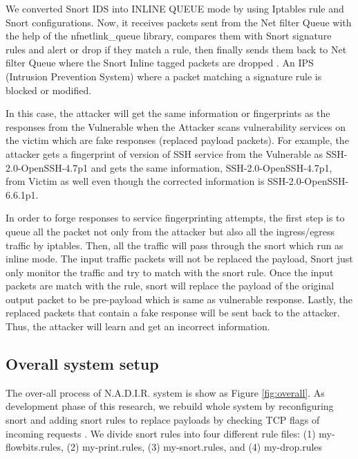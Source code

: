 We converted Snort IDS into INLINE QUEUE mode by using Iptables rule and Snort configurations. Now, it receives packets sent from the Net filter Queue with the help of the nfnetlink\_queue library, compares them with Snort signature rules and alert or drop if they match a rule, then finally sends them back to Net filter Queue where the Snort Inline tagged packets are dropped \cite{misc:netfilter}. An IPS (Intrusion Prevention System) where a packet matching a signature rule is blocked or modified.

In this case, the attacker will get the same information or fingerprints as the responses from the Vulnerable when the Attacker scans vulnerability services on the victim which are fake responses (replaced payload packets). For example, the attacker gets a fingerprint of version of SSH service from the Vulnerable as SSH-2.0-OpenSSH-4.7p1 and gets the same information, SSH-2.0-OpenSSH-4.7p1, from Victim as well even though the corrected information is SSH-2.0-OpenSSH-6.6.1p1.



In order to forge responses to service fingerprinting attempts, the first step is to queue all the packet not only from the attacker but also all the ingress/egress traffic by iptables. Then, all the traffic will pass through the snort which run as inline mode. The input traffic packets will not be replaced the payload, Snort just only monitor the traffic and try to match with the snort rule. Once the input packets are match with the rule, snort will replace the payload of the original output packet to be pre-payload which is same as vulnerable response. Lastly, the replaced packets that contain a fake response will be sent back to the attacker. Thus, the attacker will learn and get an incorrect information.

\subsection{Overall system setup}

The over-all process of N.A.D.I.R. system is show as Figure \ref{fig:overall}. As development phase of this research, we rebuild whole system by reconfiguring snort and adding snort rules to replace payloads by checking TCP flags of incoming requests \cite{misc:snortflowbit}. We divide snort rules into four different rule files: (1) my-flowbits.rules, (2) my-print.rules, (3) my-snort.rules, and (4) my-drop.rules

